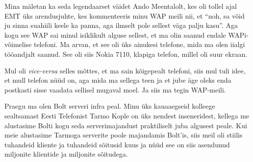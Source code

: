
Mina mäletan ka seda legendaarset väidet Ando Meentalolt, kes oli tollel ajal EMT üks arendusjuhte, kes kommenteeris minu WAP meili nii, et \enquote{noh, sa võid ju sinna suahiili keele ka panna, aga ilmselt pole sellest väga palju kasu}. Aga kogu see WAP sai minul isiklikult alguse sellest, et ma olin saanud endale WAPi-võimelise telefoni. Ma arvan, et see oli üks ainukesi telefone, mida ma olen iialgi tööandjalt saanud. See oli siis Nokia 7110, klapiga telefon, millel oli suur ekraan. 


Mul oli \emph{vice-versa} selles mõttes, et ma sain kõigepealt telefoni, siis mul tuli idee, et mull telefon nüüd on, aga mida ma sellega teen  ja et jube äge oleks enda postkasti sisse vaadata sellisel mugaval moel.  Ja siis ma tegin WAP-meili.


Praegu ma olen Bolt serveri infra peal.  Minu üks kauaaegseid kolleege sealtsamast Eesti Telefonist Tarmo Kople on üks nendest inseneridest, kellega me alustasime Bolti kogu seda serverimajandust praktiliselt juba algusest peale. Kui meie alustasime Tarmoga serverite poole majandamis Bolt'is, siis meil oli stiilis tuhandeid kliente ja tuhandeid sõitusid kuus ja nüüd see on siis asendunud miljonite klientide ja miljonite sõitudega.
